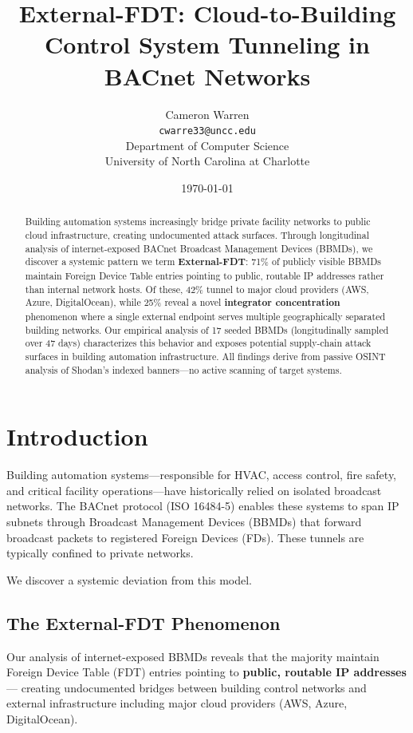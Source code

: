 \documentclass[11pt,a4paper]{article}
\title{External-FDT: Cloud-to-Building Control System Tunneling in BACnet Networks}
\author{Cameron Warren\\
  \texttt{cwarre33@uncc.edu}\\[0.5em]
  Department of Computer Science\\
  University of North Carolina at Charlotte
}
\date{\today}
\begin{document}
\maketitle

\begin{abstract}
Building automation systems increasingly bridge private facility networks to public 
cloud infrastructure, creating undocumented attack surfaces. Through longitudinal 
analysis of internet-exposed BACnet Broadcast Management Devices (BBMDs), we 
discover a systemic pattern we term \textbf{External-FDT}: 71\% of publicly visible 
BBMDs maintain Foreign Device Table entries pointing to public, routable IP addresses 
rather than internal network hosts. Of these, 42\% tunnel to major cloud providers 
(AWS, Azure, DigitalOcean), while 25\% reveal a novel \textbf{integrator concentration} 
phenomenon where a single external endpoint serves multiple geographically separated 
building networks. Our empirical analysis of 17 seeded BBMDs (longitudinally sampled over 
47 days) characterizes this behavior and exposes potential supply-chain attack 
surfaces in building automation infrastructure. All findings derive from passive 
OSINT analysis of Shodan's indexed banners---no active scanning of target systems.
\end{abstract}

\section{Introduction}
\label{sec:intro}

Building automation systems---responsible for HVAC, access control, fire safety, and 
critical facility operations---have historically relied on isolated 
broadcast networks. The BACnet protocol (ISO 16484-5)\cite{ashrae2016bacnet} enables these systems 
to span IP subnets through Broadcast Management Devices (BBMDs) that forward 
broadcast packets to registered Foreign Devices (FDs). These tunnels are 
typically confined to private networks\cite{newman2009bacnet}.

We discover a systemic deviation from this model.

\subsection{The External-FDT Phenomenon}

Our analysis of internet-exposed BBMDs reveals that the majority maintain 
Foreign Device Table (FDT) entries pointing to \textbf{public, routable IP addresses}---
creating undocumented bridges between building control networks and external 
infrastructure including major cloud providers (AWS, Azure, DigitalOcean).
\end{document}
